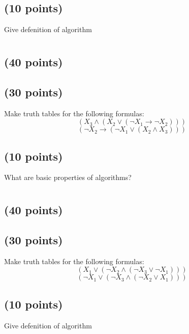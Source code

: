 \documentclass[a4paper,10pt]{article}
\begin{document}
\subsection{(10 points)}
Give defenition of algorithm

\newpage

\section{}
\subsection{(40 points)}


\subsection{(30 points)}
 Make truth tables for the following formulas:
\[
(X_{3} \wedge (X_{2} \vee (\neg X_{1} \rightarrow \neg X_{2})))
\]
\[
(\neg X_{2} \rightarrow (\neg X_{1} \vee (X_{2} \wedge X_{3})))
\]

\subsection{(10 points)}
What are basic properties of algorithms?

\newpage

\section{}
\subsection{(40 points)}


\subsection{(30 points)}
 Make truth tables for the following formulas:
\[
(X_{1} \vee (\neg X_{2} \wedge (\neg X_{3} \vee \neg X_{1})))
\]
\[
(\neg X_{1} \vee (\neg X_{3} \wedge (\neg X_{2} \vee X_{1})))
\]

\subsection{(10 points)}
Give defenition of algorithm

\newpage

\section{}
\end{document}
